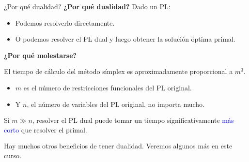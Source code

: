 \documentclass{beamer}
\begin{document}
\begin{frame}{¿Por qué dualidad?}
    \textbf{¿Por qué dualidad?} Dado un PL:
    \begin{itemize}
        \item Podemos resolverlo directamente.
        \item O podemos resolver el PL dual y luego obtener la solución óptima primal.
    \end{itemize}

    \vspace{0.5cm}
    \textbf{¿Por qué molestarse?}

    \vspace{0.3cm}
    El tiempo de cálculo del método símplex es aproximadamente proporcional a \( m^3 \).
    \begin{itemize}
        \item \( m \) es el número de restricciones funcionales del PL original.
        \item Y \( n \), el número de variables del PL original, no importa mucho.
    \end{itemize}

    \vspace{0.5cm}
    Si \( m \gg n \), resolver el PL dual puede tomar un tiempo significativamente \textcolor{blue}{más corto} que resolver el primal.

    \vspace{0.5cm}
    Hay muchos otros beneficios de tener dualidad. Veremos algunos más en este curso.
\end{frame}
\end{document}
